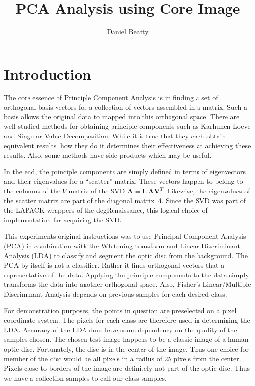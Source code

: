 \documentclass[11pt, twocolumn]{article}
\title{PCA Analysis using Core Image}
\author{Daniel Beatty}
\begin{document}
\maketitle




\section{Introduction}

The core essence of Principle Component Analysis is in finding a set of orthogonal basis vectors for a collection of vectors assembled in a matrix.  Such a basis allows the original data to mapped into this orthogonal space.  There are well studied methods for obtaining principle components such as Karhunen-Loeve and Singular Value Decomposition.  While it is true that they each obtain equivalent results, how they do it determines their effectiveness at achieving these results.  Also, some methods have side-products which may be useful.  

In the end, the principle components are simply defined in terms of eigenvectors and their eigenvalues for a ``scatter'' matrix.  These vectors happen to belong to the columns of the $V$ matrix of the SVD $\mathbf{A} = \mathbf{U\Lambda V}^T$.  Likewise, the eigenvalues of the scatter matrix are part of the diagonal matrix $\Lambda$.  Since the SVD was part of the LAPACK wrappers of the dcgRenaissance, this logical choice of implementation for acquiring the SVD.  

This experiments original instructions was to use Principal Component Analysis (PCA) in combination with the Whitening transform and Linear Discriminant Analysis (LDA) to classify and segment the optic disc from the background.   The PCA by itself is not a classifier.  Rather it finds orthogonal vectors that a representative of the data.  Applying the principle components to the data simply transforms the data into another orthogonal space.  Also, Fisher's Linear/Multiple Discriminant Analysis depends on previous samples for each desired class.   

For demonstration purposes, the points in question are preselected on a pixel coordinate system.  The pixels for each class are therefore used in determining the LDA.  Accuracy of the LDA does have some dependency on the quality of the samples chosen.  The chosen test image happens to be a classic image of a human optic disc.  Fortunately, the disc is in the center of the image.  Thus one choice for member of the disc would be all pixels in a radius of 25 pixels from the center.  Pixels close to borders of the image are definitely not part of the optic disc.  Thus we have a collection samples to call our class samples.  
\end{document}

